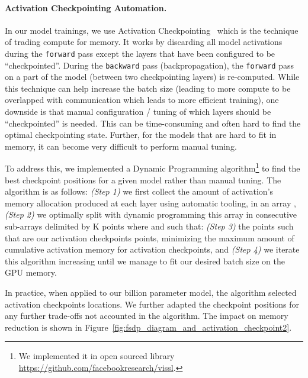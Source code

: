 \documentclass[10pt,twocolumn,letterpaper]{article}
\begin{document}
\paragraph{Activation Checkpointing Automation.}
In our model trainings, we use Activation Checkpointing~\cite{activationchen2016training} which is the technique of trading compute for memory. It works by discarding all model activations during the \texttt{forward} pass except the layers that have been configured to be ``checkpointed''. During the \texttt{backward} pass (backpropagation), the \texttt{forward} pass on a part of the model (between two checkpointing layers) is re-computed. While this technique can help increase the batch size (leading to more compute to be overlapped with communication which leads to more efficient training), one downside is that manual configuration / tuning of which layers should be ``checkpointed'' is needed. This can be time-consuming and often hard to find the optimal checkpointing state. Further, for the models that are hard to fit in memory, it can become very difficult to perform manual tuning. 

To address this, we implemented a Dynamic Programming algorithm\footnote{We implemented it in open sourced library \url{https://github.com/facebookresearch/vissl}.} to find the best checkpoint positions for a given model rather than manual tuning. The algorithm is as follows: \textit{(Step 1)} we first collect the amount of activation's memory allocation produced at each layer using automatic tooling, in an array , \textit{(Step 2)} we optimally split with dynamic programming this array in consecutive sub-arrays delimited by K points  where  and  such that:   \textit{(Step 3)} the points  such that  are our activation checkpoints points, minimizing the maximum amount of cumulative activation memory for  activation checkpoints, and \textit{(Step 4)} we iterate this algorithm increasing  until we manage to fit our desired batch size on the GPU memory.

In practice, when applied to our billion parameter model, the algorithm selected  activation checkpoints locations. We further adapted the checkpoint positions for any further trade-offs not accounted in the algorithm. The impact on memory reduction is shown in Figure~\ref{fig:fsdp_diagram_and_activation_checkpoint2}.
\end{document}
